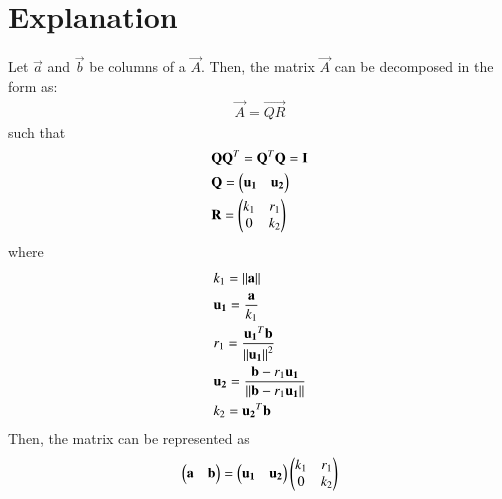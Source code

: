 \documentclass[journal,12pt,twocolumn]{IEEEtran}
\begin{document}
\section{Explanation}
Let $\vec{a}$ and $\vec{b}$ be columns of a $\vec{A}$. Then, the matrix $\vec{A}$ can be decomposed in the form as:
\begin{align}
 \vec{A} = \vec{QR} 
\end{align}
such that  
\begin{align}
	& \mathbf{Q}\mathbf{Q}^T= \mathbf{Q}^T\mathbf{Q} = \mathbf{I} \\ 
	& \mathbf{Q} = \begin{pmatrix}\mathbf{u_1} & \mathbf{u_2}\end{pmatrix}  \\
	& \mathbf{R} = \begin{pmatrix}k_1 & r_1 \\ 0 & k_2\end{pmatrix} 
\end{align}
where
\begin{align}
& k_1 = \left\lVert\mathbf{a}\right\rVert \label{1} \\
& \mathbf{u_1} = \frac{\mathbf{a}}{k_1} \label{2} \\
& r_1 = \frac{\mathbf{u_1}^T\mathbf{b}}{\left\lVert\mathbf{u_1}\right\rVert^2} \label{3} \\
& \mathbf{u_2} = \frac{\mathbf{b}-r_1\mathbf{u_1}}{\left\lVert\mathbf{b}-r_1\mathbf{u_1}\right\rVert} \label{4} \\
& k_2 = \mathbf{u_2}^T\mathbf{b} \label{5}
\end{align}
Then, the matrix can be represented as 
\begin{align}
	\begin{pmatrix}\mathbf{a} & \mathbf{b} \end{pmatrix} = \begin{pmatrix}\mathbf{u_1} & \mathbf{u_2}\end{pmatrix}\begin{pmatrix}k_1 & r_1 \\ 0 & k_2\end{pmatrix} \label{6}
\end{align}
\end{document}
